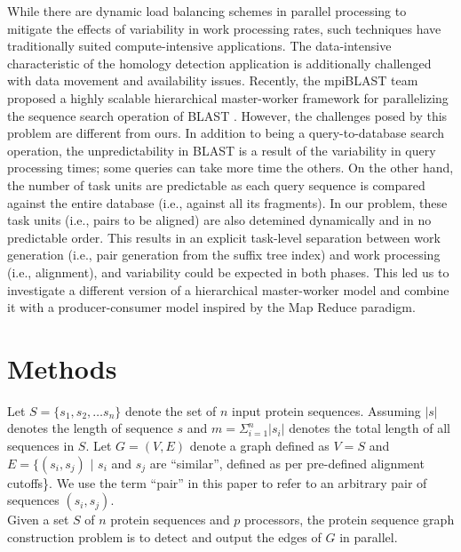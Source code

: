 \documentclass[10pt,journal,letterpaper,compsoc]{IEEEtran}
\begin{document}
While there are dynamic load balancing schemes in parallel processing to mitigate the effects of variability in work processing rates, such techniques have traditionally suited compute-intensive applications. The data-intensive characteristic of the homology detection application is additionally challenged with data movement and availability issues. Recently, the mpiBLAST team proposed a highly scalable hierarchical master-worker framework for parallelizing the sequence search operation of BLAST \cite{Lin10}. However, the challenges posed by this problem are different from ours. In addition to being a query-to-database search operation, the unpredictability in BLAST is a result of the variability in query processing times; some queries can take more time the others. On the other hand, the number of task units are predictable as each query sequence is compared against the entire database (i.e., against all its fragments). In our problem, these task units (i.e., pairs to be aligned) are also detemined dynamically and in no predictable order. This results in an explicit task-level separation between work generation (i.e., pair generation from the suffix tree index) and work processing (i.e., alignment), and variability could be expected in both phases.  This led us to investigate a different version of a hierarchical master-worker model and combine it with a producer-consumer model inspired by the Map Reduce paradigm.

\section{Methods}
\label{secMethods}

 Let $S=\{s_1,s_2,\ldots s_n\}$ denote the set of $n$ input protein sequences. Assuming $|s|$ denotes the length of sequence $s$ and $m=\Sigma_{i=1}^n |s_i|$ denotes the total length of all sequences in $S$. Let $G=(V,E)$ denote a graph defined as $V=S$ and $E=\{(s_i,s_j)$ $|$ $s_i$ and $s_j$ are ``similar'', defined as per pre-defined alignment cutoffs\}. We use the term ``pair'' in this paper to refer to an arbitrary pair of sequences $(s_i,s_j)$. \\

 Given a set $S$ of $n$ protein sequences and $p$ processors, the protein sequence graph construction problem is to detect and output the edges of $G$ in parallel.\\
\end{document}
